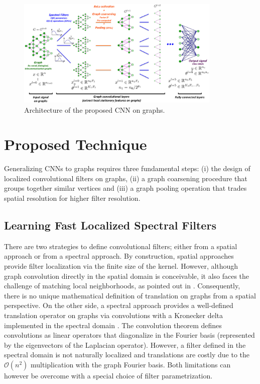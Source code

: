 \documentclass{article}
\newcommand{\G}{\mathcal{G}}
\newcommand{\bO}{\mathcal{O}}
\begin{document}
\begin{figure}[t]
\centering
\includegraphics[width=0.87\textwidth]{images/illustrationCNNgraphs}
\caption{Architecture of the proposed CNN on graphs.
}
\label{fig_illustration}
\end{figure}

\section{Proposed Technique}

Generalizing CNNs to graphs requires three fundamental steps: (i) the design of
localized convolutional filters on graphs, (ii) a graph coarsening procedure
that groups together similar vertices and (iii) a graph pooling operation that
trades spatial resolution for higher filter resolution. 

\subsection{Learning Fast Localized Spectral Filters} \label{sec:filters}

There are two strategies to define convolutional filters; either from a spatial
approach or from a spectral approach. By construction, spatial approaches
provide filter localization via the finite size of the kernel. However,
although graph convolution directly in the spatial domain is conceivable, it
also faces the challenge of matching local neighborhoods, as pointed out in
\cite{art:BrunaZarembaSzlamLeCun13DLgraphs}. Consequently, there is no unique
mathematical definition of translation on graphs from a spatial perspective. On
the other side, a spectral approach provides a well-defined translation
operator on graphs via convolutions with a Kronecker delta implemented in the
spectral domain \cite{art:ShumanNarangFrossardOrtegaVandergheynst13ReviewSPG}.
The convolution theorem \cite{book:Mallat99wavelets} defines convolutions as
linear operators that diagonalize in the Fourier basis (represented by the
eigenvectors of the Laplacian operator). However, a filter defined in the
spectral domain is not naturally localized and translations are costly due to
the $\bO(n^2)$ multiplication with the graph Fourier basis. Both limitations
can however be overcome with a special choice of filter parametrization.
\end{document}
